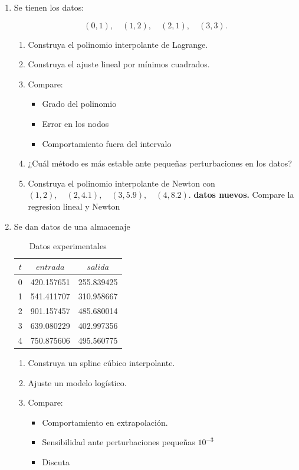 \documentclass[11pt,a4paper]{article}
\theoremstyle{ejercicio}
\begin{document}
\begin{enumerate}

\item 
Se tienen los datos:

\[
(0,1),\quad (1,2),\quad (2,1),\quad (3,3).
\]

\begin{enumerate}
\item Construya el polinomio interpolante de Lagrange.
\item Construya el ajuste lineal por mínimos cuadrados.
\item Compare:
\begin{itemize}
\item Grado del polinomio
\item Error en los nodos
\item Comportamiento fuera del intervalo
\end{itemize}
\item ¿Cuál método es más estable ante pequeñas perturbaciones en los datos?
\item Construya el polinomio interpolante de Newton con $(1,2),\quad (2,4.1),\quad (3,5.9),\quad (4,8.2).$ {\bf datos nuevos.} Compare la regresion lineal y Newton
\end{enumerate}


\item 
Se dan datos de una almacenaje

\begin{table}[h]
\centering
\begin{tabular}{c|cc}
\hline
$t$ & $entrada$ & $salida$ \\
\hline
0 & 420.157651 & 255.839425 \\
1 & 541.411707 & 310.958667 \\
2 & 901.157457 & 485.680014 \\
3 & 639.080229 & 402.997356 \\
4 & 750.875606 & 495.560775 \\
\hline
\end{tabular}
\caption{Datos experimentales}
\end{table}

\begin{enumerate}
\item Construya un spline cúbico interpolante.
\item Ajuste un modelo logístico.
\item Compare:
\begin{itemize}
\item Comportamiento en extrapolación.
\item Sensibilidad ante perturbaciones pequeñas $10^{-3}$
\item Discuta
\end{itemize}
\end{enumerate}


\end{enumerate}
\end{document}
